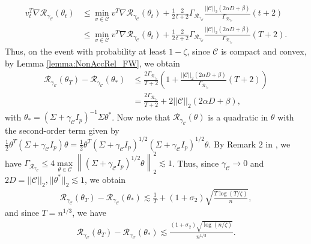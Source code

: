 \documentclass{article}
\begin{document}
\begin{align*}
v_t^T\nabla\mathcal{R}_{\gamma_{\mathcal{C}}}(\theta_t) &\leq \mathop{\min}\limits_{v \in \mathcal{C}}v^T\nabla\mathcal{R}_{\gamma_{\mathcal{C}}}(\theta_t) + \frac{1}{2}\frac{2}{t + 2}\Gamma_{\mathcal{R}_{\gamma_{\mathcal{C}}}}\frac{||\mathcal{C}||_2(2\alpha D + \beta)}{\Gamma_{\mathcal{R}_{\gamma_{\mathcal{C}}}}}(t + 2)\\
&\leq \mathop{\min}\limits_{v \in \mathcal{C}}v^T\nabla\mathcal{R}_{\gamma_{\mathcal{C}}}(\theta_t) + \frac{1}{2}\frac{2}{t + 2}\Gamma_{\mathcal{R}_{\gamma_{\mathcal{C}}}}\frac{||\mathcal{C}||_2(2\alpha D + \beta)}{\Gamma_{\mathcal{R}_{\gamma_{\mathcal{C}}}}}(T + 2).
\end{align*}
Thus, on the event with probability at least $1 - \zeta$, since $\mathcal{C}$ is compact and convex, by Lemma \ref{lemma:NonAccRel_FW}, we obtain
\begin{align*}
\mathcal{R}_{\gamma_{\mathcal{C}}}(\theta_T) - \mathcal{R}_{\gamma_{\mathcal{C}}}(\theta_{*}) &\leq \frac{2\Gamma_{\mathcal{R}_{\gamma_{\mathcal{C}}}}}{T + 2}\left(1 + \frac{||\mathcal{C}||_2(2\alpha D + \beta)}{\Gamma_{\mathcal{R}_{\gamma_{\mathcal{C}}}}}(T + 2)\right)\\
&= \frac{2\Gamma_{\mathcal{R}_{\gamma_{\mathcal{C}}}}}{T + 2} + 2||\mathcal{C}||_2(2\alpha D + \beta),
\end{align*}
with $\theta_{*} = (\Sigma + \gamma_{\mathcal{C}}I_p)^{-1}\Sigma\theta^*$. Now note that $\mathcal{R}_{\gamma_{\mathcal{C}}}(\theta)$ is a quadratic in $\theta$ with the second-order term given by $\frac{1}{2}\theta^T(\Sigma + \gamma_{\mathcal{C}}I_p)\theta = \frac{1}{2}\theta^T(\Sigma + \gamma_{\mathcal{C}}I_p)^{1/2}(\Sigma + \gamma_{\mathcal{C}}I_p)^{1/2}\theta$. By Remark $2$ in \cite{NOPL}, we have $\Gamma_{\mathcal{R}_{\gamma_{\mathcal{C}}}} \leq 4\mathop{\max}\limits_{\theta \in \mathcal{C}}\left\|(\Sigma + \gamma_{\mathcal{C}}I_p)^{1/2}\theta\right\|_2^2 \lesssim 1$. Thus, since $\gamma_{\mathcal{C}} \rightarrow 0$ and $2D = ||\mathcal{C}||_2, ||\theta^*||_2 \lesssim 1$, we obtain
\begin{align*}
\mathcal{R}_{\gamma_{\mathcal{C}}}(\theta_T) - \mathcal{R}_{\gamma_{\mathcal{C}}}(\theta_{*}) \lesssim \frac{1}{T} + (1 + \sigma_2)\sqrt{\frac{T\log(T/\zeta)}{n}},
\end{align*}
and since $T = n^{1/3}$, we have 
\begin{align*}
\mathcal{R}_{\gamma_{\mathcal{C}}}(\theta_T) - \mathcal{R}_{\gamma_{\mathcal{C}}}(\theta_{*}) \lesssim \frac{(1 + \sigma_2)\sqrt{\log(n/\zeta)}}{n^{1/3}}.
\end{align*}
\end{document}
